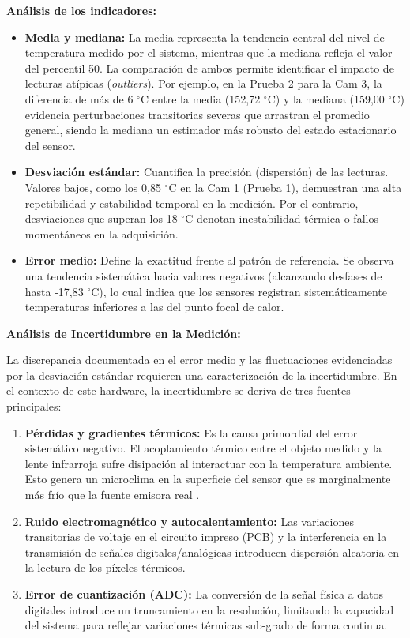 \textbf{Análisis de los indicadores:}
\begin{itemize}
    \item \textbf{Media y mediana:} La media representa la tendencia central del nivel de temperatura medido por el sistema, mientras que la mediana refleja el valor del percentil 50. La comparación de ambos permite identificar el impacto de lecturas atípicas (\textit{outliers}). Por ejemplo, en la Prueba 2 para la Cam 3, la diferencia de más de 6 $^\circ$C entre la media (152,72 $^\circ$C) y la mediana (159,00 $^\circ$C) evidencia perturbaciones transitorias severas que arrastran el promedio general, siendo la mediana un estimador más robusto del estado estacionario del sensor.
    \item \textbf{Desviación estándar:} Cuantifica la precisión (dispersión) de las lecturas. Valores bajos, como los 0,85 $^\circ$C en la Cam 1 (Prueba 1), demuestran una alta repetibilidad y estabilidad temporal en la medición. Por el contrario, desviaciones que superan los 18 $^\circ$C denotan inestabilidad térmica o fallos momentáneos en la adquisición.
    \item \textbf{Error medio:} Define la exactitud frente al patrón de referencia. Se observa una tendencia sistemática hacia valores negativos (alcanzando desfases de hasta -17,83 $^\circ$C), lo cual indica que los sensores registran sistemáticamente temperaturas inferiores a las del punto focal de calor.
\end{itemize}

\textbf{Análisis de Incertidumbre en la Medición:}

La discrepancia documentada en el error medio y las fluctuaciones evidenciadas por la desviación estándar requieren una caracterización de la incertidumbre. En el contexto de este hardware, la incertidumbre se deriva de tres fuentes principales:

\begin{enumerate}
    \item \textbf{Pérdidas y gradientes térmicos:} Es la causa primordial del error sistemático negativo. El acoplamiento térmico entre el objeto medido y la lente infrarroja sufre disipación al interactuar con la temperatura ambiente. Esto genera un microclima en la superficie del sensor que es marginalmente más frío que la fuente emisora real .
    \item \textbf{Ruido electromagnético y autocalentamiento:} Las variaciones transitorias de voltaje en el circuito impreso (PCB) y la interferencia en la transmisión de señales digitales/analógicas introducen dispersión aleatoria en la lectura de los píxeles térmicos.
    \item \textbf{Error de cuantización (ADC):} La conversión de la señal física a datos digitales introduce un truncamiento en la resolución, limitando la capacidad del sistema para reflejar variaciones térmicas sub-grado de forma continua.
\end{enumerate}

